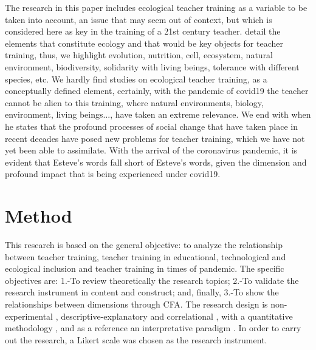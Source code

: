 \documentclass[english]{textolivre}
\begin{document}
The research in this paper includes ecological teacher training as a variable to be taken into account, an issue that may seem out of context, but which is considered here as key in the training of a 21st century teacher. \textcite{bermudez2008} %
detail the elements that constitute ecology and that would be key objects for teacher training, thus, we highlight evolution, nutrition, cell, ecosystem, natural environment, biodiversity, solidarity with living beings, tolerance with different species, etc. We hardly find studies on ecological teacher training, as a conceptually defined element, certainly, with the pandemic of covid19 the teacher cannot be alien to this training, where natural environments, biology, environment, living beings..., have taken an extreme relevance. We end with \textcite{esteve2009} %
when he states that the profound processes of social change that have taken place in recent decades have posed new problems for teacher training, which we have not yet been able to assimilate. With the arrival of the coronavirus pandemic, it is evident that Esteve's words fall short of Esteve's words, given the dimension and profound impact that is being experienced under covid19.

\section{Method}\label{sec2method}
This research is based on the general objective: to analyze the relationship between teacher training, teacher training in educational, technological and ecological inclusion and teacher training in times of pandemic. The specific objectives are: 1.-To review theoretically the research topics; 2.-To validate the research instrument in content and construct; and, finally, 3.-To show the relationships between dimensions through CFA. The research design is non-experimental \cite{kerlinger1979}, %
descriptive-explanatory \cite{arias2012} %
and correlational \cite{schuyler2008}, %
with a quantitative methodology \cite{hernandezsampieri2010}, %
and as a reference an interpretative paradigm \cite{perezserrano2004}. %
In order to carry out the research, a Likert scale was chosen as the research instrument.
\end{document}
